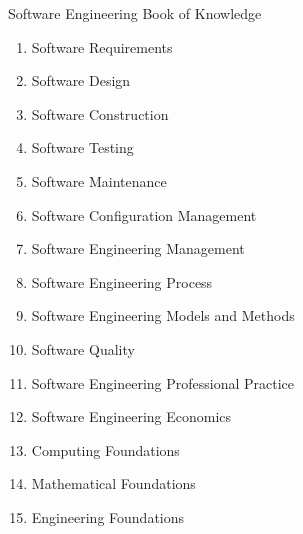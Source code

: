 \documentclass{../../slides-style}
\begin{document}
    \begin{frame}{Software Engineering Book of Knowledge}
        \begin{footnotesize}
            \begin{enumerate}
                \item Software Requirements
                \item Software Design
                \item Software Construction
                \item Software Testing
                \item Software Maintenance
                \item Software Configuration Management
                \item Software Engineering Management
                \item Software Engineering Process
                \item Software Engineering Models and Methods
                \item Software Quality
                \item Software Engineering Professional Practice
                \item Software Engineering Economics
                \item Computing Foundations
                \item Mathematical Foundations
                \item Engineering Foundations
            \end{enumerate}
        \end{footnotesize}
    \end{frame}
\end{document}
